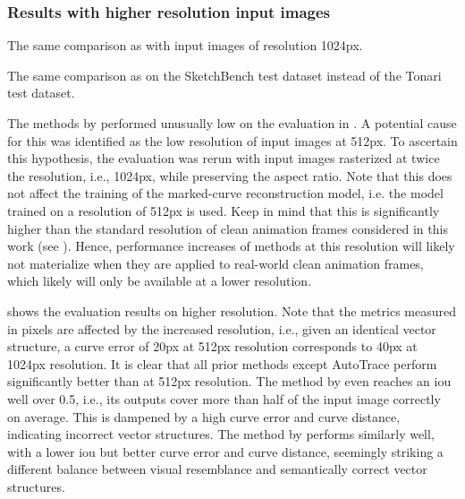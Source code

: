 \subsubsection{Results with higher resolution input images}
\label{subsec:eval.quant.1024}

\begin{table}[h]
    \centering
    
    \caption{The same comparison as  with input images of resolution 1024px.}
    \label{tab:tonari-False-1024-1.024}
\end{table}

\begin{table}[h]
    \centering
    
    \caption{The same comparison as  on the SketchBench test dataset instead of the Tonari test dataset.}
    \label{tab:sketchbench-False-1024-1.024}
\end{table}

The methods by \citet{autotrace,Puhachov2021KeypointPolyvector} performed unusually low on the evaluation in . A potential cause for this was identified as the low resolution of input images at 512px. To ascertain this hypothesis, the evaluation was rerun with input images rasterized at twice the resolution, i.e., 1024px, while preserving the aspect ratio. Note that this does not affect the training of the marked-curve reconstruction model, i.e. the model trained on a resolution of 512px is used. Keep in mind that this is significantly higher than the standard resolution of clean animation frames considered in this work (see ). Hence, performance increases of methods at this resolution will likely not materialize when they are applied to real-world clean animation frames, which likely will only be available at a lower resolution.

 shows the evaluation results on higher resolution. Note that the metrics measured in pixels are affected by the increased resolution, i.e., given an identical vector structure, a curve error of 20px at 512px resolution corresponds to 40px at 1024px resolution. It is clear that all prior methods except AutoTrace \citep{autotrace} perform significantly better than at 512px resolution. The method by \citet{Puhachov2021KeypointPolyvector} even reaches an \gls{iou} well over 0.5, i.e., its outputs cover more than half of the input image correctly on average. This is dampened by a high curve error and curve distance, indicating incorrect vector structures. The method by \citet{DBLP:conf/eccv/EgiazarianVAVST20} performs similarly well, with a lower \gls{iou} but better curve error and curve distance, seemingly striking a different balance between visual resemblance and semantically correct vector structures.

